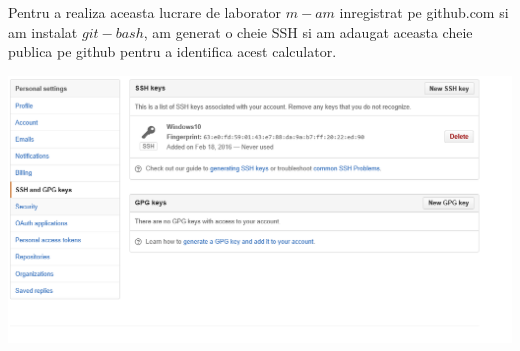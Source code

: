 Pentru a realiza aceasta lucrare de laborator $m-am$ inregistrat pe github.com si am instalat $git-bash$, am generat o cheie SSH si am adaugat aceasta cheie publica pe github pentru a identifica acest calculator.\\
\begin{center}
\includegraphics[scale=0.5]{images/1}\\
\end{center}

